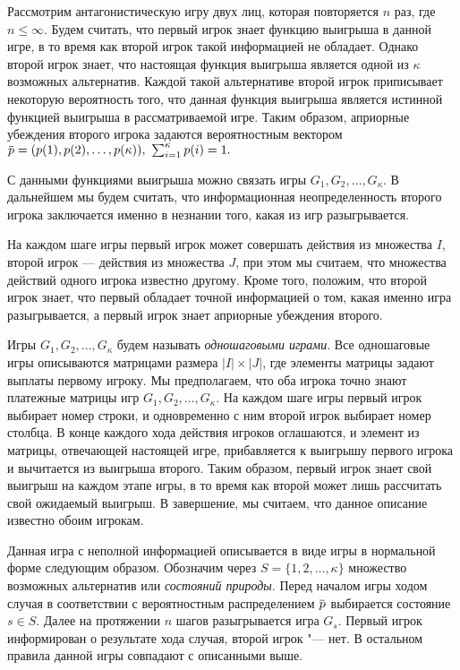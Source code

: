Рассмотрим антагонистическую игру двух лиц, которая повторяется $n$ раз, где $n\leq \infty$.
Будем считать, что первый игрок знает функцию выигрыша в данной игре, в то время как второй игрок такой информацией не обладает.
Однако второй игрок знает, что настоящая функция выигрыша является одной из $\kappa$ возможных альтернатив.
Каждой такой альтернативе второй игрок приписывает некоторую вероятность того, что данная функция выигрыша является истинной функцией выигрыша в рассматриваемой
игре.
Таким образом, априорные убеждения второго игрока задаются вероятностным вектором
$
  \pd = (\pc{1}, \pc{2}, \ldots, \pc{\kappa}),\ \sum_{i=1}^\kappa \pc{i} = 1.
$

С данными функциями выигрыша можно связать игры $G_1, G_2, \ldots, G_\kappa$.
В дальнейшем мы будем считать, что информационная неопределенность второго игрока заключается именно в незнании того, какая из игр разыгрывается.

На каждом шаге игры первый игрок может совершать действия из множества $I$, второй игрок --- действия из множества $J$, при этом мы считаем, что множества действий одного игрока известно другому.
Кроме того, положим, что второй игрок знает, что первый обладает точной информацией о том, какая именно игра разыгрывается, а первый игрок знает априорные убеждения второго.

Игры $G_1, G_2, \ldots, G_\kappa$ будем называть \emph{одношаговыми играми}.
Все одношаговые игры описываются матрицами размера $|I| \times |J|$, где элементы матрицы задают выплаты первому игроку.
Мы предполагаем, что оба игрока точно знают платежные матрицы игр $G_1, G_2, \ldots, G_\kappa$.
На каждом шаге игры первый игрок выбирает номер строки, и одновременно с ним второй игрок выбирает номер столбца.
В конце каждого хода действия игроков оглашаются, и элемент из матрицы, отвечающей настоящей игре, прибавляется к выигрышу первого игрока и вычитается из выигрыша второго.
Таким образом, первый игрок знает свой выигрыш на каждом этапе игры, в то время как второй может лишь рассчитать свой ожидаемый выигрыш.
В завершение, мы считаем, что данное описание известно обоим игрокам.

Данная игра с неполной информацией описывается в виде игры в нормальной форме следующим образом.
Обозначим через $S = \{1, 2, \ldots, \kappa\}$ множество возможных альтернатив или \emph{состояний природы}.
Перед началом игры ходом случая в соответствии с вероятностным распределением $\pd$ выбирается состояние $s \in S$.
Далее на протяжении $n$ шагов разыгрывается игра $G_s$.
Первый игрок информирован о результате хода случая, второй игрок "--- нет.
В остальном правила данной игры совпадают с описанными выше.

